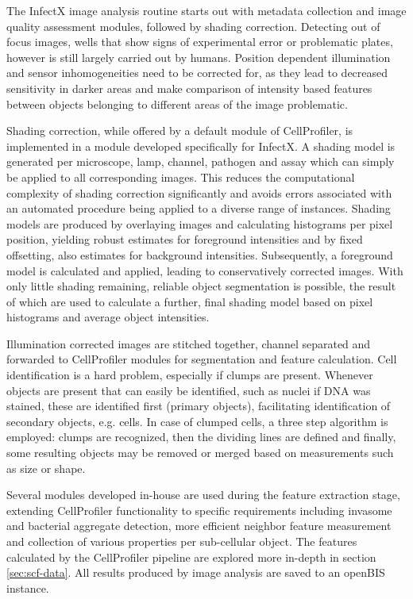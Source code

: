 The InfectX image analysis routine starts out with metadata collection and image quality assessment modules, followed by shading correction. Detecting out of focus images, wells that show signs of experimental error or problematic plates, however is still largely carried out by humans. Position dependent illumination and sensor inhomogeneities need to be corrected for, as they lead to decreased sensitivity in darker areas and make comparison of intensity based features between objects belonging to different areas of the image problematic.

Shading correction, while offered by a default module of CellProfiler, is implemented in a module developed specifically for InfectX. A shading model is generated per microscope, lamp, channel, pathogen and assay which can simply be applied to all corresponding images. This reduces the computational complexity of shading correction significantly and avoids errors associated with an automated procedure being applied to a diverse range of instances. Shading models are produced by overlaying images and calculating histograms per pixel position, yielding robust estimates for foreground intensities and by fixed offsetting, also estimates for background intensities. Subsequently, a foreground model is calculated and applied, leading to conservatively corrected images. With only little shading remaining, reliable object segmentation is possible, the result of which are used to calculate a further, final shading model based on pixel histograms and average object intensities.

Illumination corrected images are stitched together, channel separated and forwarded to CellProfiler modules for segmentation and feature calculation. Cell identification is a hard problem, especially if clumps are present. Whenever objects are present that can easily be identified, such as nuclei if DNA was stained, these are identified first (primary objects), facilitating identification of secondary objects, e.g. cells. In case of clumped cells, a three step algorithm is employed: clumps are recognized, then the dividing lines are defined and finally, some resulting objects may be removed or merged based on measurements such as size or shape.

Several modules developed in-house are used during the feature extraction stage, extending CellProfiler functionality to specific requirements including invasome and bacterial aggregate detection, more efficient neighbor feature measurement and collection of various properties per sub-cellular object. The features calculated by the CellProfiler pipeline are explored more in-depth in section \ref{sec:scf-data}. All results produced by image analysis are saved to an openBIS instance.

